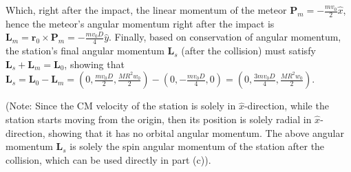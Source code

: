 \documentclass{article}
\newcommand{\br}{\textbf{r}} %
\newcommand{\bP}{\textbf{P}} %
\newcommand{\bL}{\textbf{L}} %
\begin{document}
Which, right after the impact, the linear momentum of the meteor $\bP_m = -\frac{mv_0}{2}\hat{x}$, hence the meteor's angular momentum right after the impact is $\bL_m = \br_0\times \bP_m = -\frac{mv_0D}{4}\hat{y}$. Finally, based on conservation of angular momentum, the station's final angular momentum $\bL_s$ (after the collision) must satisfy $\bL_s+\bL_m=\bL_0$, showing that $\bL_s = \bL_0-\bL_m = (0,\frac{mv_0D}{2}, \frac{MR^2w_0}{2})-(0,-\frac{mv_0D}{4},0) = (0,\frac{3mv_0D}{4},\frac{MR^2w_0}{2})$. 

(Note: Since the CM velocity of the station is solely in $\hat{x}$-direction, while the station starts moving from the origin, then its position is solely radial in $\hat{x}$-direction, showing that it has no orbital angular momentum. The above angular momentum $\bL_s$ is solely the spin angular momentum of the station after the collision, which can be used directly in part (c)).
\end{document}
